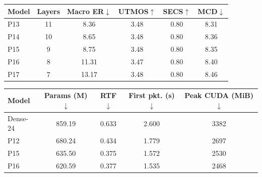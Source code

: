 \documentclass{article}
\begin{document}
\par\smallskip
\noindent\begin{minipage}{\columnwidth}
\centering
{}
\label{tab:high_compression}

\setlength{\tabcolsep}{2.5pt}
\renewcommand{\arraystretch}{1.05}
\begin{tabular}{@{}lccccc@{}}
\toprule
\textbf{Model} & \textbf{Layers} & \textbf{Macro ER$\downarrow$} &
\textbf{UTMOS$\uparrow$} & \textbf{SECS$\uparrow$} &
\textbf{MCD$\downarrow$} \\
\midrule
P13 & 11 & 8.36  & 3.48 & 0.80 & 8.31 \\
P14 & 10 & 8.65  & 3.48 & 0.80 & 8.36 \\
P15 &  9 & 8.75  & 3.48 & 0.80 & 8.35 \\
P16 &  8 & 11.31 & 3.47 & 0.80 & 8.40 \\
P17 &  7 & 13.17 & 3.48 & 0.80 & 8.46 \\
\bottomrule
\end{tabular}\par\vspace{0.6mm}

\begin{tabular}{@{}lcccc@{}}
\toprule
\textbf{Model} &
\shortstack{\textbf{Params}\\\textbf{(M)$\downarrow$}} &
\textbf{RTF$\downarrow$} &
\shortstack{\textbf{First pkt.}\\\textbf{(s)$\downarrow$}} &
\shortstack{\textbf{Peak CUDA}\\\textbf{(MiB)$\downarrow$}} \\
\midrule
Dense-24 & 859.19 & 0.633 & 2.600 & 3382 \\
P12      & 680.24 & 0.434 & 1.779 & 2697 \\
P15      & 635.50 & 0.375 & 1.572 & 2530 \\
P16      & 620.59 & 0.377 & 1.535 & 2468 \\
\bottomrule
\end{tabular}\par
\end{minipage}\par\smallskip
\end{document}
